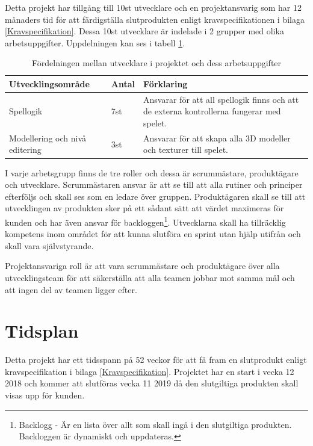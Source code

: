 \documentclass[a4paper,12pt,oneside,final]{extbook}
\begin{document}
Detta projekt har tillgång till 10st utvecklare och en projektansvarig som har 12 månaders tid för att färdigställa slutprodukten enligt kravspecifikationen i bilaga \ref{Kravspecifikation}. Dessa 10st utvecklare är indelade i 2 grupper med olika arbetsuppgifter. Uppdelningen kan ses i tabell \ref{Utvecklare}.
\begin{table}[h]
	\centering
	\caption{Fördelningen mellan utvecklare i projektet och dess arbetsuppgifter}
	\label{Utvecklare}
	\begin{tabular}{ | p{10em} | m{3em} |p{23em}| } 
		\hline
		\textbf{Utvecklingsområde}&\textbf{Antal}  &\textbf{ Förklaring} \\ 
		\hline
		Spellogik &7st & Ansvarar för att all spellogik finns och att de externa kontrollerna fungerar med spelet. \\ 
		\hline
		Modellering och nivå editering &3st & Ansvarar för att skapa alla 3D modeller och texturer till spelet.  \\ 
		\hline
	
	\end{tabular}
\end{table}


I varje arbetsgrupp finns de tre roller och dessa är scrummästare, produktägare och utvecklare. Scrummästaren ansvar är att se till att alla rutiner och principer efterföljs och skall ses som en ledare över gruppen. Produktägaren skall se till att utvecklingen av produkten sker på ett sådant sätt att värdet maximeras för kunden och har även ansvar för backloggen\footnote{Backlogg - Är en lista över allt som skall ingå i den slutgiltiga produkten. Backloggen är dynamiskt och uppdateras. }. Utvecklarna skall ha  tillräcklig kompetens inom området för att kunna slutföra en sprint utan hjälp utifrån och skall vara självstyrande\cite{Scrumguiden}. 


Projektansvariga roll är att vara scrummästare och produktägare över alla utvecklingsteam för att säkerställa att alla teamen jobbar mot samma mål och att ingen del av teamen ligger efter.

\section{Tidsplan}
Detta projekt har ett tidsspann på 52 veckor för att få fram en slutprodukt enligt kravspecifikation i bilaga \ref{Kravspecifikation}. Projektet har en start i vecka 12 2018 och kommer att slutföras vecka 11 2019 då den slutgiltiga produkten skall visas upp för kunden. 
\end{document}
